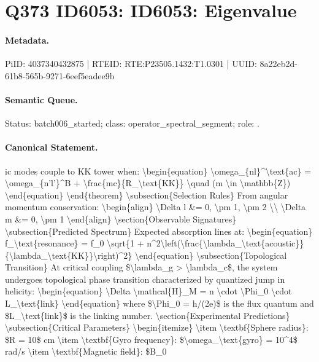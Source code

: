\section*{Q373 ID6053: ID6053: Eigenvalue}
\paragraph{Metadata.}
PiID: 4037340432875 | RTEID: RTE:P23505.1432:T1.0301 | UUID: 8a22eb2d-61b8-565b-9271-6eef5eadee9b

\paragraph{Semantic Queue.}
Status: batch006\_started; class: operator\_spectral\_segment; role: .

\paragraph{Canonical Statement.}
ic modes couple to KK tower when: \textbackslash{}begin\{equation\} \textbackslash{}omega\_\{nl\}\textasciicircum{}\textbackslash{}text\{ac\} = \textbackslash{}omega\_\{n'l'\}\textasciicircum{}B + \textbackslash{}frac\{mc\}\{R\_\textbackslash{}text\{KK\}\} \textbackslash{}quad (m \textbackslash{}in \textbackslash{}mathbb\{Z\}) \textbackslash{}end\{equation\} \textbackslash{}end\{theorem\} \textbackslash{}subsection\{Selection Rules\} From angular momentum conservation: \textbackslash{}begin\{align\} \textbackslash{}Delta l \&= 0, \textbackslash{}pm 1, \textbackslash{}pm 2 \textbackslash{}\textbackslash{} \textbackslash{}Delta m \&= 0, \textbackslash{}pm 1 \textbackslash{}end\{align\} \textbackslash{}section\{Observable Signatures\} \textbackslash{}subsection\{Predicted Spectrum\} Expected absorption lines at: \textbackslash{}begin\{equation\} f\_\textbackslash{}text\{resonance\} = f\_0 \textbackslash{}sqrt\{1 + n\textasciicircum{}2\textbackslash{}left(\textbackslash{}frac\{\textbackslash{}lambda\_\textbackslash{}text\{acoustic\}\}\{\textbackslash{}lambda\_\textbackslash{}text\{KK\}\}\textbackslash{}right)\textasciicircum{}2\} \textbackslash{}end\{equation\} \textbackslash{}subsection\{Topological Transition\} At critical coupling \$\textbackslash{}lambda\_g > \textbackslash{}lambda\_c\$, the system undergoes topological phase transition characterized by quantized jump in helicity: \textbackslash{}begin\{equation\} \textbackslash{}Delta \textbackslash{}mathcal\{H\}\_M = n \textbackslash{}cdot \textbackslash{}Phi\_0 \textbackslash{}cdot L\_\textbackslash{}text\{link\} \textbackslash{}end\{equation\} where \$\textbackslash{}Phi\_0 = h/(2e)\$ is the flux quantum and \$L\_\textbackslash{}text\{link\}\$ is the linking number. \textbackslash{}section\{Experimental Predictions\} \textbackslash{}subsection\{Critical Parameters\} \textbackslash{}begin\{itemize\} \textbackslash{}item \textbackslash{}textbf\{Sphere radius\}: \$R = 10\$ cm \textbackslash{}item \textbackslash{}textbf\{Gyro frequency\}: \$\textbackslash{}omega\_\textbackslash{}text\{gyro\} = 10\textasciicircum{}4\$ rad/s \textbackslash{}item \textbackslash{}textbf\{Magnetic field\}: \$B\_0

